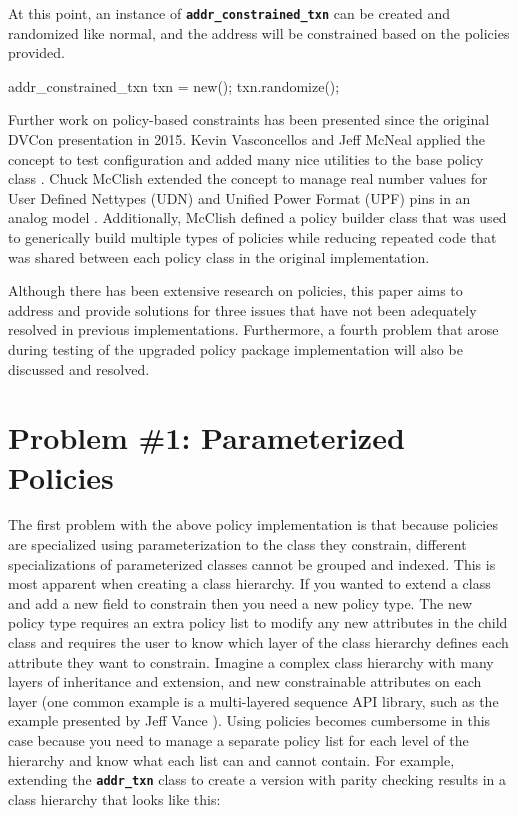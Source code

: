 \documentclass[conference,onecolumn]{IEEEtran}
\newcommand{\code}[1]{
\textbf{\texttt{#1}}
}
\begin{document}
At this point, an instance of \code{addr_constrained_txn} can be created and randomized like normal, and the address will be constrained based on the policies provided.

{\begin{svcode}
addr_constrained_txn txn = new();
txn.randomize();
\end{svcode}
\captionof{figure}{Randomizing an instance of \code{addr_constrained_txn}}}

Further work on policy-based constraints has been presented since the original DVCon presentation in 2015. Kevin Vasconcellos and Jeff McNeal applied the concept to test configuration and added many nice utilities to the base policy class \cite{b3}. Chuck McClish extended the concept to manage real number values for User Defined Nettypes (UDN) and Unified Power Format (UPF) pins in an analog model \cite{b4}. Additionally, McClish defined a policy builder class that was used to generically build multiple types of policies while reducing repeated code that was shared between each policy class in the original implementation.

Although there has been extensive research on policies, this paper aims to address and provide solutions for three issues that have not been adequately resolved in previous implementations. Furthermore, a fourth problem that arose during testing of the upgraded policy package implementation will also be discussed and resolved.

\section{Problem \#1: Parameterized Policies}

The first problem with the above policy implementation is that because policies are specialized using parameterization to the class they constrain, different specializations of parameterized classes cannot be grouped and indexed. This is most apparent when creating a class hierarchy. If you wanted to extend a class and add a new field to constrain then you need a new policy type. The new policy type requires an extra policy list to modify any new attributes in the child class and requires the user to know which layer of the class hierarchy defines each attribute they want to constrain. Imagine a complex class hierarchy with many layers of inheritance and extension, and new constrainable attributes on each layer (one common example is a multi-layered sequence API library, such as the example presented by Jeff Vance \cite{b5}). Using policies becomes cumbersome in this case because you need to manage a separate policy list for each level of the hierarchy and know what each list can and cannot contain. For example, extending the \code{addr_txn} class to create a version with parity checking results in a class hierarchy that looks like this:
\end{document}
